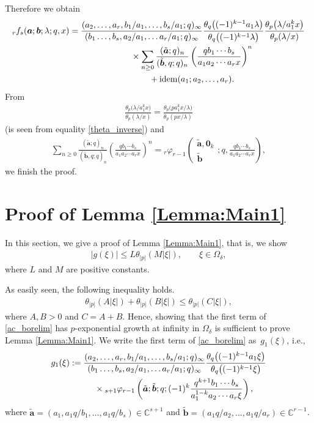 \documentclass[pdftex]{sigma}
\numberwithin{equation}{section}
\newcommand{\idem}{{\rm idem}}
\begin{document}
Therefore we obtain
\begin{gather*}
{}_rf_s(\bm{a};\bm{b};\lambda;q,x)= \frac{(a_2,\ldots,a_r,b_1/a_1,\ldots,b_{s}/a_1;q)_\infty}{(b_1\ldots,b_s,a_2/a_1,\ldots a_r/a_1;q)_\infty}\frac{\theta_q\big((-1)^{k-1}a_1\lambda\big)}{\theta_q\big((-1)^{k-1}\lambda\big)}\frac{\theta_p\big(\lambda/a_1^kx\big)}{\theta_p(\lambda/x)}\\
\hphantom{{}_rf_s(\bm{a};\bm{b};\lambda;q,x)=}{} \times\sum_{n\ge0}\frac{(\tilde{\bm{a}};q)_n}{(\tilde{\bm{b}},q;q)_n}\left(\frac{qb_1\cdots b_s}{a_1a_2\cdots a_rx}\right)^n\\
\hphantom{{}_rf_s(\bm{a};\bm{b};\lambda;q,x)=}{} +\idem(a_1;a_2,\ldots,a_r).
\end{gather*}
From
\begin{gather*}
\frac{\theta_p\big(\lambda/a_1^kx\big)}{\theta_p(\lambda/x)}=\frac{\theta_p\big(pa_1^kx/\lambda\big)}{\theta_p(px/\lambda)}
\end{gather*}
(is seen from equality \eqref{theta_inverse}) and
\begin{gather*}
\sum_{n\ge0}\frac{(\tilde{\bm{a}};q)_n}{(\tilde{\bm{b}},q;q)_n}\left(\frac{qb_1\cdots b_s}{a_1a_2\cdots a_rx}\right)^n={}_r\varphi_{r-1}\left(
\begin{matrix}\tilde{\bm{a}},\bm{0}_k\\
\tilde{\bm{b}}
\end{matrix};q,\frac{qb_1\cdots b_s}{a_1a_2\cdots a_rx}\right),
\end{gather*}
we finish the proof.
\section{Proof of Lemma \ref{Lemma:Main1}}\label{Section:Proof_Lemma:Main1}
In this section, we give a proof of Lemma \ref{Lemma:Main1}, that is, we show
\begin{gather*}
\vert g(\xi)\vert\le L \theta_{\vert p\vert}(M\vert \xi\vert),\qquad \xi\in\Omega_\delta,
\end{gather*}
where $L$ and $M$ are positive constants.

As easily seen, the following inequality holds.
\begin{gather*}
\theta_{|p|}(A|\xi|)+\theta_{|p|}(B|\xi|)\le \theta_{|p|}(C|\xi|),
\end{gather*}
where $A, B>0$ and $C=A+B$. Hence, showing that the first term of \eqref{ac_borelim} has $p$-exponential growth at infinity in $\Omega_\delta$ is sufficient to prove Lemma \ref{Lemma:Main1}. We write the first term of \eqref{ac_borelim} as~$g_1(\xi)$, i.e.,
\begin{gather*}
g_1(\xi):=\frac{(a_2,\ldots,a_r,b_1/a_1,\ldots,b_{s}/a_1;q)_\infty}{(b_1\ldots,b_s,a_2/a_1,\ldots a_r/a_1;q)_\infty}\frac{\theta_q\big((-1)^{k-1}a_1\xi\big)}{\theta_q\big((-1)^{k-1}\xi\big)}\\
\hphantom{g_1(\xi):=}{}\times {}_{s+1}\varphi_{r-1}\left(\tilde{\bm{a}};\tilde{\bm{b}};q;(-1)^k\frac{q^{k+1}b_1\cdots b_s}{a_1^{1-k}a_2\cdots a_r\xi}\right),
\end{gather*}
where $\tilde{\bm{a}}=(a_1,a_1q/b_1,\ldots,a_1q/b_s)\in\mathbb{C}^{s+1}$ and $\tilde{\bm{b}}=(a_1q/a_2,\ldots,a_1q/a_r)\in\mathbb{C}^{r-1}$.
\end{document}
